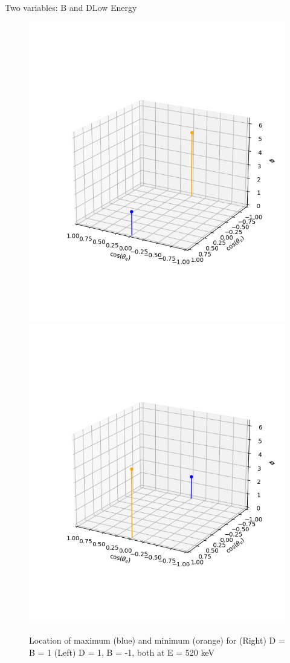 \documentclass{beamer}
\begin{document}
\begin{frame}{Two variables: B and D}{Low Energy}
	\begin{figure}
		\centering
		\includegraphics[width=0.4\paperwidth]{plots/posD_posB_lowE_max_min}
		\includegraphics[width=0.4\paperwidth]{plots/posD_negB_lowE_max_min}
		\caption{Location of maximum (blue) and minimum (orange) for (Right) D = B = 1 (Left) D = 1, B = -1, both at E = 520 keV}
	\end{figure}
\end{frame}
\end{document}

